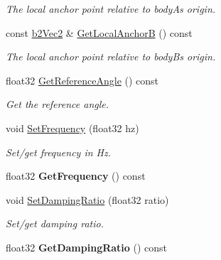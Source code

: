 \begin{DoxyCompactItemize}
\begin{DoxyCompactList}\small\item\em The local anchor point relative to bodyA\textquotesingle{}s origin. \end{DoxyCompactList}\item 
const \hyperlink{structb2_vec2}{b2\+Vec2} \& \hyperlink{classb2_weld_joint_a7fdc0c047dc04bbc8c5ca67011be071c}{Get\+Local\+AnchorB} () const \hypertarget{classb2_weld_joint_a7fdc0c047dc04bbc8c5ca67011be071c}{}\label{classb2_weld_joint_a7fdc0c047dc04bbc8c5ca67011be071c}

\begin{DoxyCompactList}\small\item\em The local anchor point relative to bodyB\textquotesingle{}s origin. \end{DoxyCompactList}\item 
float32 \hyperlink{classb2_weld_joint_a0d347bf22be13aa8a96f615e230b095a}{Get\+Reference\+Angle} () const \hypertarget{classb2_weld_joint_a0d347bf22be13aa8a96f615e230b095a}{}\label{classb2_weld_joint_a0d347bf22be13aa8a96f615e230b095a}

\begin{DoxyCompactList}\small\item\em Get the reference angle. \end{DoxyCompactList}\item 
void \hyperlink{classb2_weld_joint_a0796404379b7562f1af557729085c447}{Set\+Frequency} (float32 hz)\hypertarget{classb2_weld_joint_a0796404379b7562f1af557729085c447}{}\label{classb2_weld_joint_a0796404379b7562f1af557729085c447}

\begin{DoxyCompactList}\small\item\em Set/get frequency in Hz. \end{DoxyCompactList}\item 
float32 {\bfseries Get\+Frequency} () const \hypertarget{classb2_weld_joint_aca7b913d9d780a8fbd8c47f9fef04b7c}{}\label{classb2_weld_joint_aca7b913d9d780a8fbd8c47f9fef04b7c}

\item 
void \hyperlink{classb2_weld_joint_aea79865e590edba09eff9d2243689967}{Set\+Damping\+Ratio} (float32 ratio)\hypertarget{classb2_weld_joint_aea79865e590edba09eff9d2243689967}{}\label{classb2_weld_joint_aea79865e590edba09eff9d2243689967}

\begin{DoxyCompactList}\small\item\em Set/get damping ratio. \end{DoxyCompactList}\item 
float32 {\bfseries Get\+Damping\+Ratio} () const \hypertarget{classb2_weld_joint_a99f69fbebb982382819f2955819196d7}{}\label{classb2_weld_joint_a99f69fbebb982382819f2955819196d7}


\end{DoxyCompactItemize}
